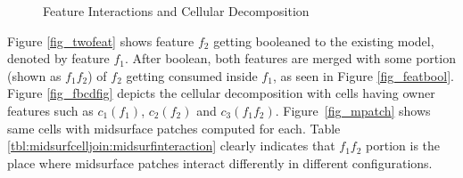 \begin{figure}[h!]
\centering     %
{} \quad
{} \quad
{} 
\caption{Feature Interactions and Cellular Decomposition}
  \label{fig:midsurfcelljoin:featureinteractions}
\end{figure}


Figure \ref{fig_twofeat} shows feature $f_2$ getting booleaned to the existing model, denoted by feature $f_1$. After boolean, both features are merged with some portion (shown as $f_1f_2$) of $f_2$ getting consumed inside $f_1$, as seen in Figure \ref{fig_featbool}. Figure \ref{fig_fbcdfig} depicts the cellular decomposition with cells having owner features such as $c_1(f_1)$, $c_2(f_2)$ and $c_3(f_1f_2)$. Figure~\ref{fig_mpatch} shows same cells with midsurface patches computed for each. Table \ref{tbl:midsurfcelljoin:midsurfinteraction} clearly indicates that $f_1f_2$ portion is the place where midsurface patches interact differently in different configurations. 

